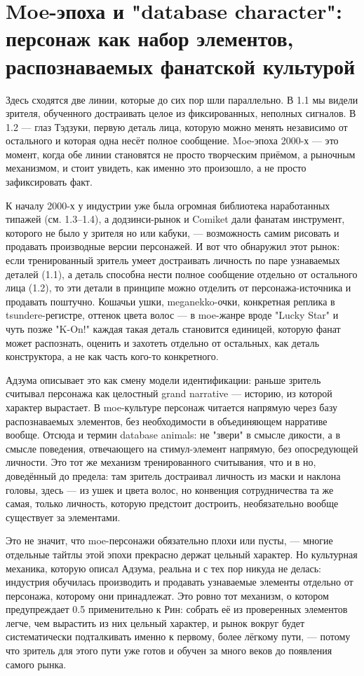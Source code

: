 \section{Moe-эпоха и "database character": персонаж как набор элементов, распознаваемых фанатской культурой}

Здесь сходятся две линии, которые до сих пор шли параллельно. В 1.1 мы видели зрителя, обученного достраивать целое из фиксированных, неполных сигналов. В 1.2 — глаз Тэдзуки, первую деталь лица, которую можно менять независимо от остального и которая одна несёт полное сообщение. Moe-эпоха 2000-х — это момент, когда обе линии становятся не просто творческим приёмом, а рыночным механизмом, и стоит увидеть, как именно это произошло, а не просто зафиксировать факт.

К началу 2000-х у индустрии уже была огромная библиотека наработанных типажей (см. 1.3--1.4), а додзинси-рынок и Comiket дали фанатам инструмент, которого не было у зрителя но или кабуки, — возможность самим рисовать и продавать производные версии персонажей. И вот что обнаружил этот рынок: если тренированный зритель умеет достраивать личность по паре узнаваемых деталей (1.1), а деталь способна нести полное сообщение отдельно от остального лица (1.2), то эти детали в принципе можно отделить от персонажа-источника и продавать поштучно. Кошачьи ушки, meganekko-очки, конкретная реплика в tsundere-регистре, оттенок цвета волос — в moe-жанре вроде "Lucky Star" и чуть позже "K-On!" каждая такая деталь становится единицей, которую фанат может распознать, оценить и захотеть отдельно от остальных, как деталь конструктора, а не как часть кого-то конкретного.

Адзума описывает это как смену модели идентификации: раньше зритель считывал персонажа как целостный grand narrative — историю, из которой характер вырастает. В moe-культуре персонаж читается напрямую через базу распознаваемых элементов, без необходимости в объединяющем нарративе вообще. Отсюда и термин database animals: не "звери" в смысле дикости, а в смысле поведения, отвечающего на стимул-элемент напрямую, без опосредующей личности. Это тот же механизм тренированного считывания, что и в но, доведённый до предела: там зритель достраивал личность из маски и наклона головы, здесь — из ушек и цвета волос, но конвенция сотрудничества та же самая, только личность, которую предстоит достроить, необязательно вообще существует за элементами.

Это не значит, что moe-персонажи обязательно плохи или пусты, — многие отдельные тайтлы этой эпохи прекрасно держат цельный характер. Но культурная механика, которую описал Адзума, реальна и с тех пор никуда не делась: индустрия обучилась производить и продавать узнаваемые элементы отдельно от персонажа, которому они принадлежат. Это ровно тот механизм, о котором предупреждает 0.5 применительно к Рин: собрать её из проверенных элементов легче, чем вырастить из них цельный характер, и рынок вокруг будет систематически подталкивать именно к первому, более лёгкому пути, — потому что зритель для этого пути уже готов и обучен за много веков до появления самого рынка.
